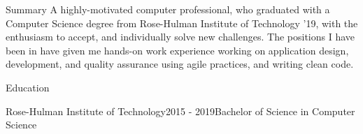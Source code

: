 \documentclass{resume} %
\begin{document}
\begin{rSection}{Summary}
{A highly-motivated computer professional, who graduated with a Computer Science degree from Rose-Hulman Institute of Technology '19, 
with the enthusiasm to accept, and individually solve new challenges. The positions I have been in have given me hands-on work experience 
working on application design, development, and quality assurance using agile practices, and writing clean code.}
\end{rSection}

\begin{rSection}{Education}
\begin{rsemisection}{Rose-Hulman Institute of Technology}{2015 - 2019}{Bachelor of Science in Computer Science}
\end{rsemisection}
\end{rSection}
\end{document}
